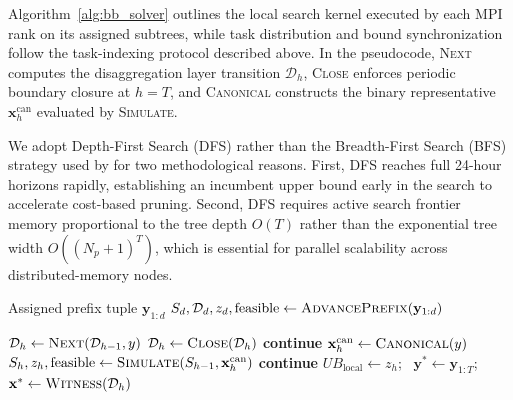\documentclass[Journal,letterpaper,InsideFigs]{ascelike-new}
\begin{document}
Algorithm~\ref{alg:bb_solver} outlines the local search kernel executed by each MPI rank on its assigned subtrees, while task distribution and bound synchronization follow the task-indexing protocol described above. In the pseudocode, \textsc{Next} computes the disaggregation layer transition $\mathcal{D}_h$, \textsc{Close} enforces periodic boundary closure at $h=T$, and \textsc{Canonical} constructs the binary representative $\mathbf{x}_h^{\mathrm{can}}$ evaluated by \textsc{Simulate}.

We adopt Depth-First Search (DFS) rather than the Breadth-First Search (BFS) strategy used by  for two methodological reasons. First, DFS reaches full 24-hour horizons rapidly, establishing an incumbent upper bound early in the search to accelerate cost-based pruning. Second, DFS requires active search frontier memory proportional to the tree depth $O(T)$ rather than the exponential tree width $O((N_p+1)^T)$, which is essential for parallel scalability across distributed-memory nodes.

\begin{algorithm}[H]
	\footnotesize
	\caption{Local Branch-and-Bound Search of an Assigned Subtree}
	\label{alg:bb_solver}
	\begin{algorithmic}[1]
		\Require Assigned prefix tuple $\mathbf{y}_{1:d}$
		\State $S_d, \mathcal{D}_d, z_d, \text{feasible} \gets \Call{AdvancePrefix}{\mathbf{y}_{1:d}}$ 
		 \Return \EndIf
		\State {}

		 \State \Return {} \EndIf
		\State $\mathcal{D}_h \gets \Call{Next}{\mathcal{D}_{h-1}, y}$ 
		 \State $\mathcal{D}_h \gets \Call{Close}{\mathcal{D}_h}$ \EndIf {}
		 \State \textbf{continue} \EndIf {}
		\State $\mathbf{x}_h^{\mathrm{can}} \gets \Call{Canonical}{y}$
		\State $S_h, z_h, \text{feasible} \gets \Call{Simulate}{S_{h-1}, \mathbf{x}_h^{\mathrm{can}}}$ 
		 \State \textbf{continue} \EndIf {}
		\State {}
		\State $UB_{\mathrm{local}} \gets z_h$; \ $\mathbf{y}^* \gets \mathbf{y}_{1:T}$; \ $\mathbf{x}^* \gets \Call{Witness}{\mathcal{D}_h}$ 
		\EndIf
		\EndFor
		\EndProcedure
	\end{algorithmic}
\end{algorithm}
\end{document}
